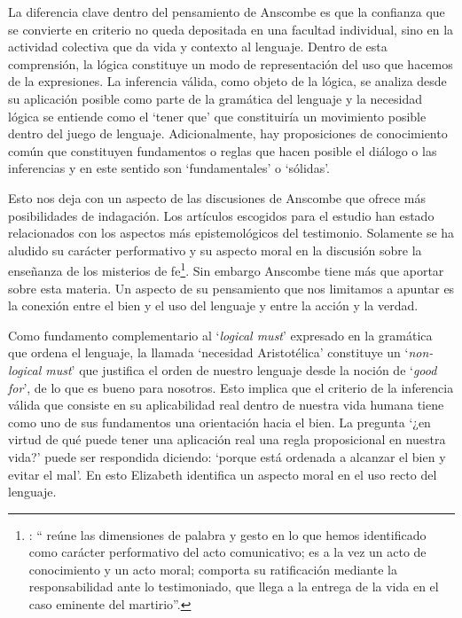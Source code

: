 La diferencia clave dentro del pensamiento de Anscombe es que la confianza que se convierte en criterio no queda depositada en una facultad individual, sino en la actividad colectiva que da vida y contexto al lenguaje. Dentro de esta comprensión, la lógica constituye un modo de representación del uso que hacemos de la expresiones. La inferencia válida, como objeto de la lógica, se analiza desde su aplicación posible como parte de la gramática del lenguaje y la necesidad lógica se entiende como el `tener que' que constituiría un movimiento posible dentro del juego de lenguaje. Adicionalmente, hay proposiciones de conocimiento común que constituyen fundamentos o reglas que hacen posible el diálogo o las inferencias y en este sentido son `fundamentales' o `sólidas'.

Esto nos deja con un aspecto de las discusiones de Anscombe que ofrece más posibilidades de indagación. Los artículos escogidos para el estudio han estado relacionados con los aspectos más epistemológicos del testimonio. Solamente se ha aludido su carácter performativo y su aspecto moral en la discusión sobre la enseñanza de los misterios de fe\footnote{\Cite[Cf.][450]{prades2015testimonio}: \enquote{ reúne las dimensiones de palabra y gesto en lo que hemos identificado como carácter performativo del acto comunicativo; es a la vez un acto de conocimiento y un acto moral; comporta su ratificación mediante la responsabilidad ante lo testimoniado, que llega a la entrega de la vida en el caso eminente del martirio}.}. Sin embargo Anscombe tiene más que aportar sobre esta materia. Un aspecto de su pensamiento que nos limitamos a apuntar es la conexión entre el bien y el uso del lenguaje y entre la acción y la verdad.

Como fundamento complementario al `\emph{logical must}' expresado en la gramática que ordena el lenguaje, la llamada `necesidad Aristotélica' constituye un `\emph{non-logical must}' que justifica el orden de nuestro lenguaje desde la noción de `\emph{good for}', de lo que es bueno para nosotros. Esto implica que el criterio de la inferencia válida que consiste en su aplicabilidad real dentro de nuestra vida humana tiene como uno de sus fundamentos una orientación hacia el bien. La pregunta \enquote*{¿en virtud de qué puede tener una aplicación real una regla proposicional en nuestra vida?} puede ser respondida diciendo: \enquote*{porque está ordenada a alcanzar el bien y evitar el mal}. En esto Elizabeth identifica un aspecto moral en el uso recto del lenguaje.

